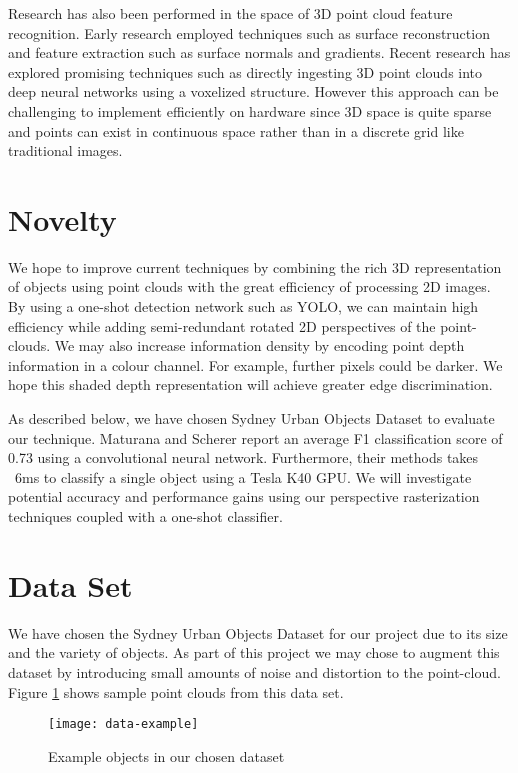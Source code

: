 \documentclass[runningheads,a4paper]{llncs}
\begin{document}
Research has also been performed in the space of 3D point cloud feature
recognition. Early research employed techniques such as surface reconstruction
and feature extraction such as surface normals and gradients. Recent research
has explored promising techniques such as directly ingesting 3D point clouds
into deep neural networks using a voxelized structure. However this approach can
be challenging to implement efficiently on hardware since 3D space is quite
sparse and points can exist in continuous space rather than in a discrete grid
like traditional images.

\section{Novelty}
We hope to improve current techniques by combining the rich 3D representation of
objects using point clouds with the great efficiency of processing 2D images. By
using a one-shot detection network such as YOLO, we can maintain high efficiency
while adding semi-redundant rotated 2D perspectives of the point-clouds. We may
also increase information density by encoding point depth information in a
colour channel. For example, further pixels could be darker. We hope this shaded
depth representation will achieve greater edge discrimination.

As described below, we have chosen Sydney Urban Objects Dataset to evaluate our
technique. Maturana and Scherer \cite{maturana2015voxnet} report an average F1
classification score of 0.73 using a convolutional neural network. Furthermore,
their methods takes ~6ms to classify a single object using a Tesla K40 GPU. We
will investigate potential accuracy and performance gains using our perspective
rasterization techniques coupled with a one-shot classifier.

\section{Data Set}
We have chosen the Sydney Urban Objects Dataset for our project due to its size
and the variety of objects. As part of this project we may chose to augment this
dataset by introducing small amounts of noise and distortion to the point-cloud.
Figure \ref{fig:data-example} shows sample point clouds from this data set.

\begin{figure}[h]
  \caption{Example objects in our chosen dataset}
  \centering
  \texttt{[image: data-example]}
  \label{fig:data-example}
\end{figure}
\end{document}
